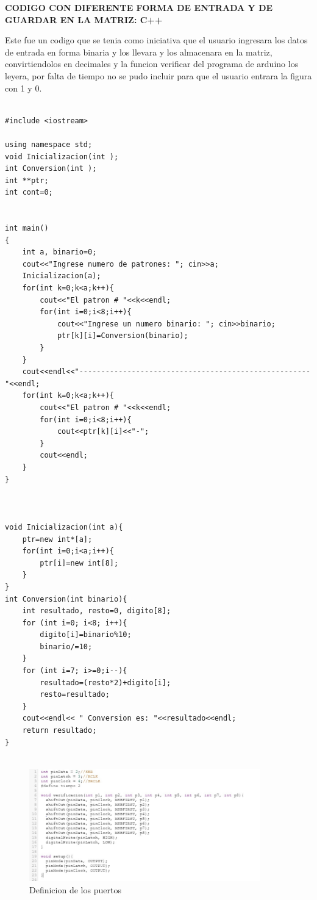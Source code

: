 \documentclass{article}
\begin{document}
\textbf{CODIGO CON DIFERENTE FORMA DE ENTRADA Y DE GUARDAR EN LA MATRIZ: C++} 

 \vspace{1cm}
 
 Este fue un codigo que se tenia como iniciativa que el usuario ingresara los datos de entrada en forma binaria y los llevara y los almacenara en la matriz, convirtiendolos en decimales y la funcion verificar del programa de arduino los leyera, por falta de tiempo no se pudo incluir para que el usuario entrara la figura con 1 y 0.

\begin{verbatim}

#include <iostream>

using namespace std;
void Inicializacion(int );
int Conversion(int );
int **ptr;
int cont=0;


int main()
{
    int a, binario=0;
    cout<<"Ingrese numero de patrones: "; cin>>a;
    Inicializacion(a);
    for(int k=0;k<a;k++){
        cout<<"El patron # "<<k<<endl;
        for(int i=0;i<8;i++){
            cout<<"Ingrese un numero binario: "; cin>>binario;
            ptr[k][i]=Conversion(binario);
        }
    }
    cout<<endl<<"-----------------------------------------------------"<<endl;
    for(int k=0;k<a;k++){
        cout<<"El patron # "<<k<<endl;
        for(int i=0;i<8;i++){
            cout<<ptr[k][i]<<"-";
        }
        cout<<endl;
    }
}



void Inicializacion(int a){
    ptr=new int*[a];
    for(int i=0;i<a;i++){
        ptr[i]=new int[8];
    }
}
int Conversion(int binario){
    int resultado, resto=0, digito[8];
    for (int i=0; i<8; i++){
        digito[i]=binario%10;
        binario/=10;
    }
    for (int i=7; i>=0;i--){
        resultado=(resto*2)+digito[i];
        resto=resultado;
    }
    cout<<endl<< " Conversion es: "<<resultado<<endl;
    return resultado;
}


\end{verbatim}




\begin{figure}[h]
\includegraphics[width=10cm]{Definicion de los puertos.jpeg}
\centering
\caption{Definicion de los puertos}
\label{fig:gestion}
\end{figure}
\end{document}
